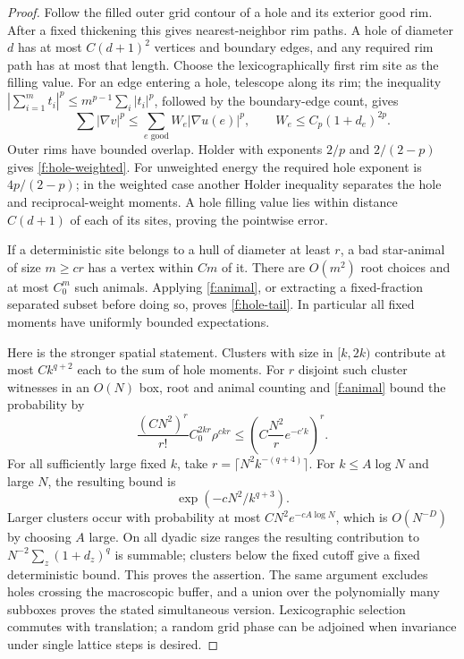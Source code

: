 \begin{proof}
Follow the filled outer grid contour of a hole and its exterior good rim.
After a fixed thickening this gives nearest-neighbor rim paths. A hole
of diameter $d$ has at most $C(d+1)^2$ vertices and boundary edges, and
any required rim path has at most that length. Choose the lexicographically
first rim site as the filling value. For an edge entering a hole, telescope
along its rim; the inequality $|\sum_{i=1}^m t_i|^p\le
m^{p-1}\sum_i|t_i|^p$, followed by the boundary-edge count, gives
\[
 \sum|\nabla v|^p\le\sum_{e\text{ good}}W_e|\nabla u(e)|^p,
 \qquad W_e\le C_p(1+d_e)^{2p}.
\]
Outer rims have bounded overlap. Holder with exponents $2/p$ and
$2/(2-p)$ gives \eqref{f:hole-weighted}. For unweighted energy the required
hole exponent is $4p/(2-p)$; in the weighted case another Holder inequality
separates the hole and reciprocal-weight moments. A hole filling value lies
within distance $C(d+1)$ of each of its sites, proving the pointwise error.

If a deterministic site belongs to a hull of diameter at least $r$, a bad
star-animal of size $m\ge cr$ has a vertex within $Cm$ of it. There are
$O(m^2)$ root choices and at most $C_0^m$ such animals. Applying
\eqref{f:animal}, or extracting a fixed-fraction separated subset before
doing so, proves \eqref{f:hole-tail}. In particular all fixed moments
have uniformly bounded expectations.

Here is the stronger spatial statement. Clusters with size in $[k,2k)$
contribute at most $Ck^{q+2}$ each to the sum of hole moments. For $r$
disjoint such cluster witnesses in an $O(N)$ box, root and animal counting
and \eqref{f:animal} bound the probability by
\[
 \frac{(CN^2)^r}{r!}C_0^{2kr}\rho^{ckr}
 \le\left(C\frac{N^2}{r}e^{-c'k}\right)^r.
\]
For all sufficiently large fixed $k$, take
$r=\lceil N^2k^{-(q+4)}\rceil$. For $k\le A\log N$ and large $N$, the
resulting bound is
\[
 \exp(-cN^2/k^{q+3}).
\]
Larger clusters occur with
probability at most $CN^2e^{-cA\log N}$, which is $O(N^{-D})$ by
choosing $A$ large. On all dyadic size ranges the resulting contribution
to $N^{-2}\sum_z(1+d_z)^q$ is summable; clusters below the fixed cutoff
give a fixed deterministic bound. This proves the assertion. The same
argument excludes holes crossing the macroscopic buffer, and a union over
the polynomially many subboxes proves the stated simultaneous version.
Lexicographic selection commutes with translation; a random grid phase
can be adjoined when invariance under single lattice steps is desired.
\end{proof}

